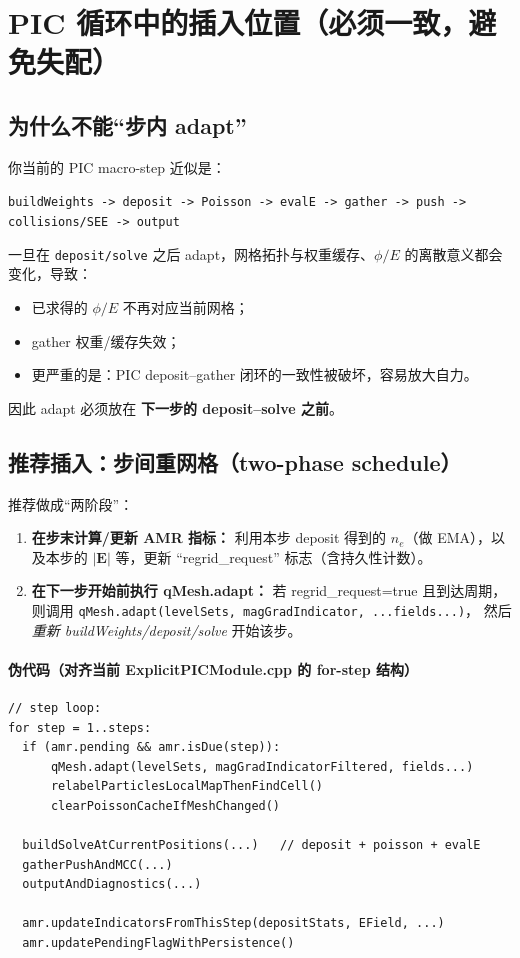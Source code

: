 \documentclass[UTF8,11pt,a4paper]{ctexart}
\begin{document}
\section{PIC 循环中的插入位置（必须一致，避免失配）}
\subsection{为什么不能“步内 adapt”}
你当前的 PIC macro-step 近似是：
\begin{center}
\texttt{buildWeights -> deposit -> Poisson -> evalE -> gather -> push -> collisions/SEE -> output}
\end{center}
一旦在 \texttt{deposit/solve} 之后 adapt，网格拓扑与权重缓存、$\phi/E$ 的离散意义都会变化，导致：
\begin{itemize}[leftmargin=1.6em]
  \item 已求得的 $\phi/E$ 不再对应当前网格；
  \item gather 权重/缓存失效；
  \item 更严重的是：PIC deposit--gather 闭环的一致性被破坏，容易放大自力。
\end{itemize}
因此 adapt 必须放在 \textbf{下一步的 deposit--solve 之前}。

\subsection{推荐插入：步间重网格（two-phase schedule）}
推荐做成“两阶段”：
\begin{enumerate}[leftmargin=1.6em]
  \item \textbf{在步末计算/更新 AMR 指标：} 利用本步 deposit 得到的 $n_e$（做 EMA），以及本步的 $|\mathbf{E}|$ 等，更新 ``regrid\_request'' 标志（含持久性计数）。
  \item \textbf{在下一步开始前执行 qMesh.adapt：} 若 regrid\_request=true 且到达周期，则调用
  \texttt{qMesh.adapt(levelSets, magGradIndicator, ...fields...)}，
  然后 \emph{重新 buildWeights/deposit/solve} 开始该步。
\end{enumerate}

\paragraph{伪代码（对齐当前 ExplicitPICModule.cpp 的 for-step 结构）}
\begin{lstlisting}
// step loop:
for step = 1..steps:
  if (amr.pending && amr.isDue(step)):
      qMesh.adapt(levelSets, magGradIndicatorFiltered, fields...)
      relabelParticlesLocalMapThenFindCell()
      clearPoissonCacheIfMeshChanged()

  buildSolveAtCurrentPositions(...)   // deposit + poisson + evalE
  gatherPushAndMCC(...)
  outputAndDiagnostics(...)

  amr.updateIndicatorsFromThisStep(depositStats, EField, ...)
  amr.updatePendingFlagWithPersistence()
\end{lstlisting}
\end{document}
